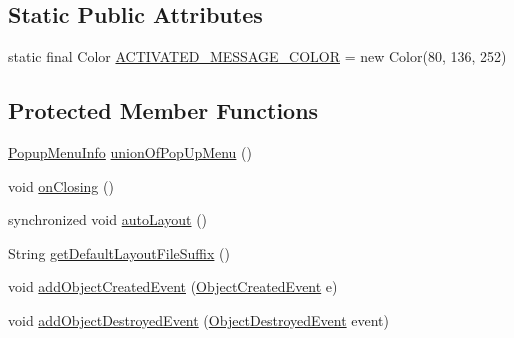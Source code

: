 \subsection*{Static Public Attributes}
\begin{DoxyCompactItemize}
\item 
static final Color \hyperlink{classorg_1_1tzi_1_1use_1_1gui_1_1views_1_1diagrams_1_1behavior_1_1communicationdiagram_1_1_communication_diagram_a6fe11a13d3c06194b0036889588d4ada}{A\-C\-T\-I\-V\-A\-T\-E\-D\-\_\-\-M\-E\-S\-S\-A\-G\-E\-\_\-\-C\-O\-L\-O\-R} = new Color(80, 136, 252)
\end{DoxyCompactItemize}
\subsection*{Protected Member Functions}
\begin{DoxyCompactItemize}
\item 
\hyperlink{classorg_1_1tzi_1_1use_1_1gui_1_1views_1_1diagrams_1_1_diagram_view_1_1_popup_menu_info}{Popup\-Menu\-Info} \hyperlink{classorg_1_1tzi_1_1use_1_1gui_1_1views_1_1diagrams_1_1behavior_1_1communicationdiagram_1_1_communication_diagram_aa6fd9f0109d0bc96c254bd1b9cdb981a}{union\-Of\-Pop\-Up\-Menu} ()
\item 
void \hyperlink{classorg_1_1tzi_1_1use_1_1gui_1_1views_1_1diagrams_1_1behavior_1_1communicationdiagram_1_1_communication_diagram_ab2a827740a5965cfe3afcb7afdfb1973}{on\-Closing} ()
\item 
synchronized void \hyperlink{classorg_1_1tzi_1_1use_1_1gui_1_1views_1_1diagrams_1_1behavior_1_1communicationdiagram_1_1_communication_diagram_ad82eb14c330f7bd83ce1e618fdd907e9}{auto\-Layout} ()
\item 
String \hyperlink{classorg_1_1tzi_1_1use_1_1gui_1_1views_1_1diagrams_1_1behavior_1_1communicationdiagram_1_1_communication_diagram_ae1baf3b24403b1a5ef9eafa13b5d6c17}{get\-Default\-Layout\-File\-Suffix} ()
\item 
void \hyperlink{classorg_1_1tzi_1_1use_1_1gui_1_1views_1_1diagrams_1_1behavior_1_1communicationdiagram_1_1_communication_diagram_a556407364e70a886b91cb1a74460a37e}{add\-Object\-Created\-Event} (\hyperlink{classorg_1_1tzi_1_1use_1_1uml_1_1sys_1_1events_1_1_object_created_event}{Object\-Created\-Event} e)
\item 
void \hyperlink{classorg_1_1tzi_1_1use_1_1gui_1_1views_1_1diagrams_1_1behavior_1_1communicationdiagram_1_1_communication_diagram_a5d91b94abb9eebac02877c7abbba196a}{add\-Object\-Destroyed\-Event} (\hyperlink{classorg_1_1tzi_1_1use_1_1uml_1_1sys_1_1events_1_1_object_destroyed_event}{Object\-Destroyed\-Event} event)

\end{DoxyCompactItemize}
